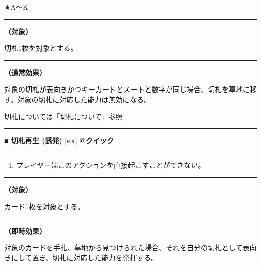 \documentclass[twocolumn,a5paper,papersize,10pt]{jarticle}
\begin{document}
★A〜K

\vspace{1mm}%
\hrule height 0.1mm depth 0mm width 66.5mm %
\vspace{1mm}%
{\bf（対象）}

切札1枚を対象とする。
\vspace{1mm}%
\hrule height 0.1mm depth 0mm width 66.5mm %
\vspace{1mm}%

{\bf（通常効果）}

対象の切札が表向きかつキーカードとスートと数字が同じ場合、切札を墓地に移す。対象の切札に対応した能力は無効になる。 

切札については「切札について」参照
\vspace{2mm} %
\hrule height 0.5mm depth 0mm width 66.5mm %
\vspace{1mm} %
{\normalsize\bf ■ 切札再生 {\scriptsize (誘発) [ex]}} %
\hfill 
{\small\bf @クイック }


\vspace{1mm}%
\hrule height 0.1mm depth 0mm width 66.5mm %
\vspace{1mm}%


\vspace{-1zh}%
\begin{enumerate}
\renewcommand{\labelenumi}{※}
\setlength{\leftskip}{-0.3cm}
\setlength{\itemsep}{0pt} %
\setlength{\parskip}{0pt} %

\item プレイヤーはこのアクションを直接起こすことができない。

\vspace{-3mm}%
\end{enumerate}
\vspace{1mm}%
\hrule height 0.1mm depth 0mm width 66.5mm %
\vspace{1mm}%
{\bf（対象）}

カード1枚を対象とする。
\vspace{1mm}%
\hrule height 0.1mm depth 0mm width 66.5mm %
\vspace{1mm}%

{\bf（即時効果）}

対象のカードを手札、墓地から見つけられた場合、それを自分の切札として表向きにして置き、切札に対応した能力を発揮する。 
\end{document}
